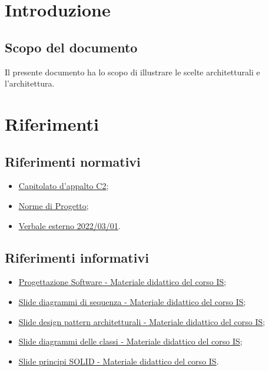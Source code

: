 \documentclass[a4paper, 12pt]{article}
\begin{document}
\makefrontpage

\makeversioni

\tableofcontents
\clearpage

\section{Introduzione}
\subsection{Scopo del documento}
Il presente documento ha lo scopo di illustrare le scelte architetturali e l'architettura.

\section{Riferimenti}
\subsection{Riferimenti normativi}
\begin{itemize}
    \item \underline{\href{https://www.math.unipd.it/~tullio/IS-1/2021/Progetto/C2.pdf}{Capitolato d'appalto C2}};
    \item \underline{\href{https://github.com/iota97/WinningSoftwareSolution/blob/main/public/interni/norme_di_progetto/norme_di_progetto_v2.0.2.pdf}{Norme di Progetto}};
    \item \underline{\href{https://github.com/iota97/WinningSoftwareSolution/blob/main/public/esterni/verbali/2022_01_03_E.pdf}{Verbale esterno 2022/03/01}}.
\end{itemize}
\subsection{Riferimenti informativi}
\begin{itemize}
    \item \underline{\href{https://www.math.unipd.it/~tullio/IS-1/2021/Dispense/T09.pdf}{Progettazione Software - Materiale didattico del corso IS}};
    \item \underline{\href{https://www.math.unipd.it/~rcardin/swea/2022/Diagrammi\%20di\%20Sequenza.pdf}{Slide diagrammi di sequenza - Materiale didattico del corso IS}};
    \item \underline{\href{https://www.math.unipd.it/~rcardin/swea/2022/Software\%20Architecture\%20Patterns.pdf}{Slide design pattern architetturali - Materiale didattico del corso IS}};
    \item \underline{\href{https://www.math.unipd.it/~rcardin/swea/2021/Diagrammi\%20delle\%20Classi_4x4.pdf}{Slide diagrammi delle classi - Materiale didattico del corso IS}};
    \item \underline{\href{https://www.math.unipd.it/~rcardin/sweb/2022/L03.pdf}{Slide principi SOLID - Materiale didattico del corso IS}}.
\end{itemize}
\end{document}
